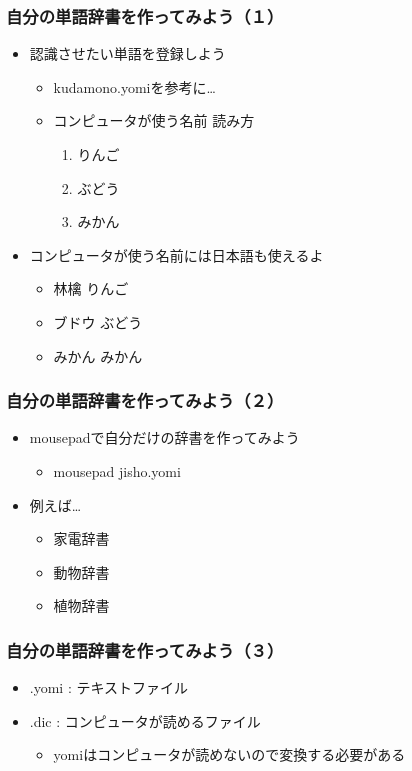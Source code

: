 \documentclass[14pt]{beamer}
\begin{document}
\begin{frame}
  \frametitle{自分の単語辞書を作ってみよう（１）}
  \begin{itemize}
    \item 認識させたい単語を登録しよう
    \begin{itemize}
      \item kudamono.yomiを参考に…
      \item \<コンピュータが使う名前\> \<読み方\>
      \renewcommand{\theenumi}{\roman{enumi}}
      \begin{enumerate}
        \item りんご
        \item ぶどう
        \item みかん
      \end{enumerate}
    \end{itemize}
    \item \<コンピュータが使う名前\>には日本語も使えるよ
    \begin{itemize}
      \item 林檎 りんご
      \item ブドウ ぶどう
      \item みかん みかん
    \end{itemize}
  \end{itemize}
\end{frame}

\begin{frame}
  \frametitle{自分の単語辞書を作ってみよう（２）}
  \begin{itemize}
    \item mousepadで自分だけの辞書を作ってみよう
    \begin{itemize}
      \item mousepad jisho.yomi
    \end{itemize}
    \item 例えば…
    \begin{itemize}
      \item 家電辞書
      \item 動物辞書
      \item 植物辞書
    \end{itemize}
  \end{itemize}
\end{frame}

\begin{frame}
  \frametitle{自分の単語辞書を作ってみよう（３）}
  \begin{itemize}
    \item .yomi : テキストファイル
    \item .dic : コンピュータが読めるファイル
    \begin{itemize}
      \item yomiはコンピュータが読めないので変換する必要がある
    \end{itemize}
  \end{itemize}
\end{frame}
\end{document}
